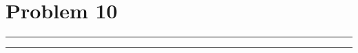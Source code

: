 \documentclass{article}
\theoremstyle{definition}
\newenvironment{solution}{\bigskip\hrule{\hfill}}{\bigskip\hrule{\hfill}} %
\begin{document}

\newpage


\section*{Problem 10}

\begin{solution}


\end{solution}

\end{document}
